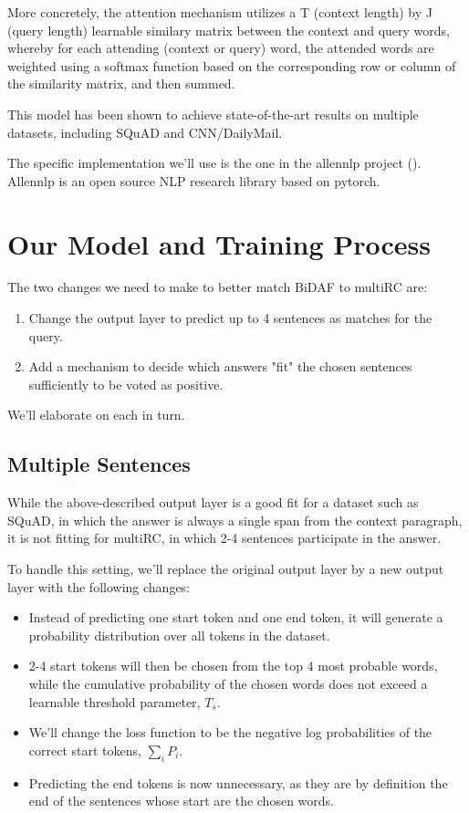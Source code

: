 \documentclass[12pt, a4paper]{article}
\begin{document}
\begin{multicols}{2}
			More concretely, the attention mechanism utilizes a T (context length) by J (query length) learnable similary matrix between the context and query words, whereby for each attending (context or query) word, the attended words are weighted using a softmax function based on the corresponding row or column of the similarity matrix, and then summed.
			
			This model has been shown to achieve state-of-the-art results on multiple datasets, including SQuAD and CNN/DailyMail.
			
			The specific implementation we'll use is the one in the allennlp project (\cite{Gardner2017ADS}). Allennlp is an open source NLP research library based on pytorch.
		
		\section{Our Model and Training Process}
		
			The two changes we need to make to better match BiDAF to multiRC are:
			\begin{enumerate}
				\item Change the output layer to predict up to 4 sentences as matches for the query.
				\item Add a mechanism to decide which answers "fit" the chosen sentences sufficiently to be voted as positive.
			\end{enumerate}
			We'll elaborate on each in turn.
			
			\subsection{Multiple Sentences}
		
				While the above-described output layer is a good fit for a dataset such as SQuAD, in which the answer is always a single span from the context paragraph, it is not fitting for multiRC, in which 2-4 sentences participate in the answer.
				
				To handle this setting, we'll replace the original output layer by a new output layer with the following changes:
				\begin{itemize}
					\item Instead of predicting one start token and one end token, it will generate a probability distribution over all tokens in the dataset. 
					\item 2-4 start tokens will then be chosen from the top 4 most probable words, while the cumulative probability of the chosen words does not exceed a learnable threshold parameter, $ T_s $.
					\item We'll change the loss function to be the negative log probabilities of the correct start tokens, $ \sum_i P_i $.
					\item Predicting the end tokens is now unnecessary, as they are by definition the end of the sentences whose start are the chosen words.
				\end{itemize}
			

\end{multicols}
\end{document}
